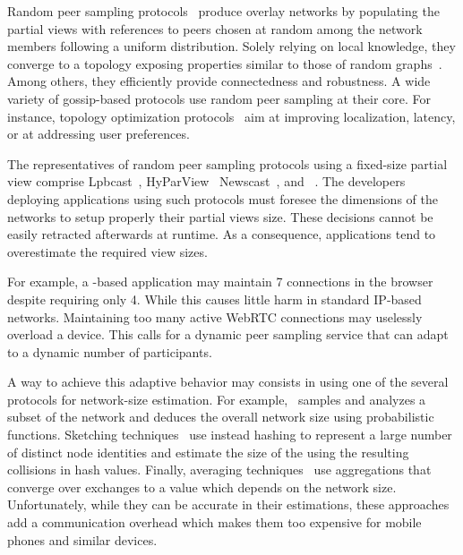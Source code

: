 Random peer sampling protocols~\cite{jelasity2004peer,jelasity2007gossip}
produce overlay networks by populating the partial views with references to
peers chosen at random among the network members following a uniform
distribution. Solely relying on local knowledge, they converge to a topology
exposing properties similar to those of random
graphs~\cite{erdos1959random}. Among others, they efficiently provide
connectedness and robustness. A wide variety of gossip-based protocols use
random peer sampling at their core. For instance, topology optimization
protocols~\cite{voulgaris2005epidemic,jelasity2009tman} aim at improving
localization, latency, or at addressing user preferences.

The representatives of random peer sampling protocols using a
fixed-size partial view comprise
Lpbcast~\cite{eugster2003lightweight},
HyParView~\cite{leitao2007hyparview}
Newscast~\cite{tolgyeski2009adaptive}, and
\CYCLON~\cite{voulgaris2005cyclon}. The developers deploying
applications using such protocols must foresee the dimensions of the
networks to setup properly their partial views size. These decisions
cannot be easily retracted afterwards at runtime. As a consequence,
applications tend to overestimate the required view sizes.

For example, a \CYCLON-based application may maintain 7 connections in
the browser despite requiring only 4. While this causes little harm in
standard IP-based networks. Maintaining too many active WebRTC
connections may uselessly overload a device. This calls for a dynamic
peer sampling service that can adapt to a dynamic number of
participants.

A way to achieve this adaptive behavior may consists in using one of
the several protocols for network-size estimation. For
example,~\cite{ganesh2007peer} samples and analyzes a subset of the
network and deduces the overall network size using probabilistic
functions.  Sketching techniques~\cite{baquero2012extrema} use instead
hashing to represent a large number of distinct node identities and
estimate the size of the using the resulting collisions in hash
values. Finally, averaging techniques~\cite{jelasity2004epidemic} use
aggregations that converge over exchanges to a value which depends on
the network size. Unfortunately, while they can be accurate in their
estimations, these approaches add a communication overhead which makes
them too expensive for mobile phones and similar devices.



